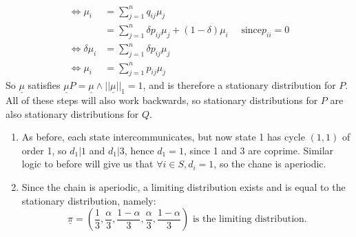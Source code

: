 \documentclass{article}
\begin{document}
\begin{enumerate}
\begin{enumerate}
\begin{align*}
\iff \mu_i &= \sum^n_{j=1}q_{ij}\mu_j\\
&= \sum^n_{j=1}\delta p_{ij}\mu_j + (1-\delta)\mu_i \quad \mbox{ since
$p_{ii}=0$}\\
\iff \delta \mu_i &= \sum^n_{j=1}\delta p_{ij} \mu_j\\
\iff \mu_i &= \sum^n_{j=1}p_{ij}\mu_j
\end{align*}
So $\underline{\mu}$ satisfies $\underline{\mu}P = \underline{\mu} \wedge
||\underline{\mu}||_1 = 1$, and is therefore a stationary distribution for $P$.
All of these steps will also work backwards, so stationary distributions for $P$
are also stationary distributions for $Q$.
\begin{enumerate}
\item
As before, each state intercommunicates, but now state 1 has cycle $(1,1)$ of
order 1, so $d_1|1$ and $d_1 | 3$, hence $d_1 =1$, since 1 and 3 are coprime.
Similar logic to before will give us that $\forall i \in S, d_i = 1$, so the
chane is aperiodic.
\item
Since the chain is aperiodic, a limiting distribution exists and is equal to the
stationary distribution, namely:
$$
\underline{\pi} =
\left(\frac{1}{3},\frac{\alpha}{3},\frac{1-\alpha}{3},\frac{\alpha}{3},\frac{1-\alpha}{3}\right)
\mbox{ is the limiting distribution.}
$$
\end{enumerate}

\end{enumerate}
\end{enumerate}
\end{document}
